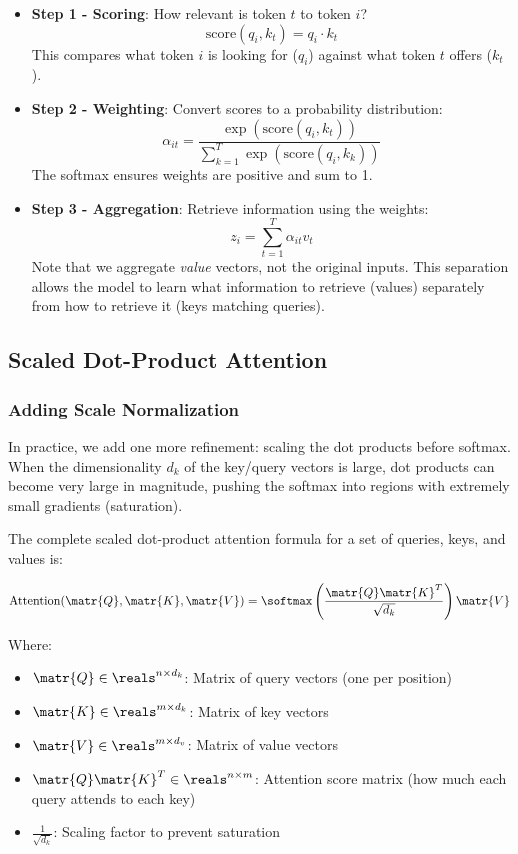\begin{itemize}
  \item \textbf{Step 1 - Scoring}: How relevant is token $t$ to token $i$?
    \[
      \text{score}(q_i, k_t) = q_i \cdot k_t
    \]
    This compares what token $i$ is looking for ($q_i$) against what token $t$ offers ($k_t$).

  \item \textbf{Step 2 - Weighting}: Convert scores to a probability distribution:
    \[
      \alpha_{it} = \frac{\exp(\text{score}(q_i, k_t))}{\sum_{k=1}^{T} \exp(\text{score}(q_i, k_k))}
    \]
    The softmax ensures weights are positive and sum to 1.

  \item \textbf{Step 3 - Aggregation}: Retrieve information using the weights:
    \[
      z_i = \sum_{t=1}^{T} \alpha_{it} v_t
    \]
    Note that we aggregate \textit{value} vectors, not the original inputs. This separation allows the model to learn what information to retrieve (values) separately from how to retrieve it (keys matching queries).
\end{itemize}


\subsection{Scaled Dot-Product Attention}

\subsubsection{Adding Scale Normalization}

In practice, we add one more refinement: scaling the dot products before softmax. When the dimensionality $d_k$ of the key/query vectors is large, dot products can become very large in magnitude, pushing the softmax into regions with extremely small gradients (saturation).

The complete scaled dot-product attention formula for a set of queries, keys, and values is:

\begin{equation}
  \text{Attention}(\matr{Q}, \matr{K}, \matr{V}) = \softmax\left(\frac{\matr{Q}\matr{K}^T}{\sqrt{d_k}}\right)\matr{V}
\end{equation}

Where:
\begin{itemize}
  \item $\matr{Q} \in \reals^{n \times d_k}$: Matrix of query vectors (one per position)
  \item $\matr{K} \in \reals^{m \times d_k}$: Matrix of key vectors
  \item $\matr{V} \in \reals^{m \times d_v}$: Matrix of value vectors
  \item $\matr{Q}\matr{K}^T \in \reals^{n \times m}$: Attention score matrix (how much each query attends to each key)
  \item $\frac{1}{\sqrt{d_k}}$: Scaling factor to prevent saturation
\end{itemize}


